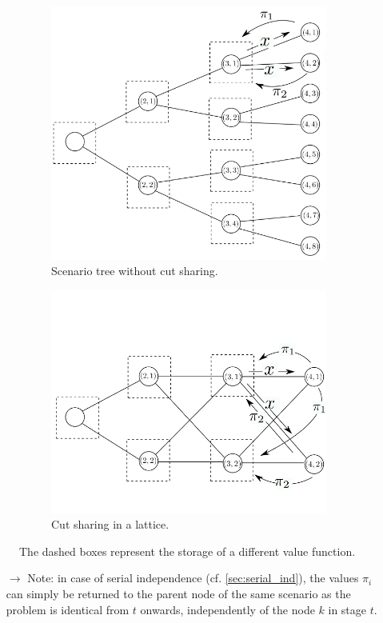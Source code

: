 \documentclass[12pt, openany]{report}
\theoremstyle{definition}
\begin{document}
\begin{figure}[H]
	\centering 
	\begin{subfigure}[b]{.49\textwidth}
		\includegraphics[width=\textwidth]{img/tree_no_sharing.png}
		\caption{Scenario tree without cut sharing.}
	\end{subfigure}
	\hfill 
	\begin{subfigure}[b]{.5\textwidth}
		\includegraphics[width=\textwidth]{img/lattice_sharing.png}
		\caption{Cut sharing in a lattice.}
	\end{subfigure}
	\caption{The dashed boxes represent the storage of a different value function.}
	\label{fig:sharing}
\end{figure}
\begin{itemize}
	\item [$\to$] Note: in case of serial independence (cf. \ref{sec:serial_ind}), the values $\pi_i$ can simply be returned to the parent node of the same scenario as the problem is identical from $t$ onwards, independently of the node $k$ in stage $t$.
\end{itemize}
\end{document}
